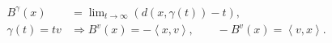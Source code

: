 \documentclass[border=8pt]{standalone}
\begin{document}
$\displaystyle
\begin{aligned}
B^{\gamma}(x)
&=\lim_{t\to\infty}\left(d\left(x,\gamma(t)\right)-t\right),\\[4pt]
\gamma(t)=tv
&\Longrightarrow
B^{v}(x)=-\left\langle x,v\right\rangle,
\qquad -B^{v}(x)=\left\langle v,x\right\rangle.
\end{aligned}
$
\end{document}
